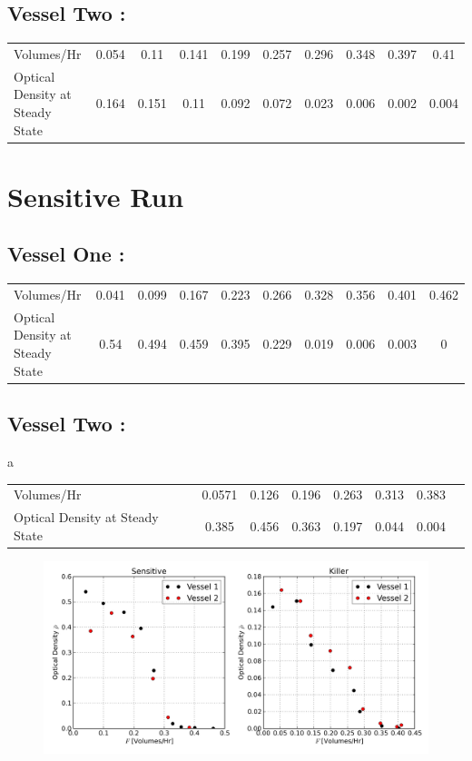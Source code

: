 \subsection*{Vessel Two :}
\begin{center}
\begin{tabular}{l|ccccccccc}
  Volumes/Hr & 0.054 & 0.11 & 0.141 & 0.199 & 0.257 & 0.296 & 0.348 & 0.397 & 0.41 \\
  Optical Density at Steady State & 0.164 & 0.151 & 0.11 & 0.092 & 0.072 & 0.023 & 0.006 & 0.002 & 0.004 \\
\end{tabular}
\end{center}

\section{Sensitive Run}
\subsection*{Vessel One :}
\begin{center}
\begin{tabular}{l|ccccccccc}
  Volumes/Hr & 0.041 & 0.099 & 0.167 & 0.223 & 0.266 & 0.328 & 0.356 & 0.401 & 0.462 \\
 Optical Density at Steady State & 0.54 & 0.494 & 0.459 & 0.395 & 0.229 & 0.019 & 0.006 & 0.003 & 0  \\
\end{tabular}
\end{center}

\subsection*{Vessel Two :}
\begin{center}
a\begin{tabular}{l|ccccccc}
 Volumes/Hr & 0.0571 & 0.126 & 0.196 & 0.263 & 0.313 & 0.383  \\
  Optical Density at Steady State & 0.385 & 0.456 & 0.363 & 0.197 & 0.044 & 0.004 \\
\end{tabular}
\end{center}


\begin{figure}[H]
  \centering
    \includegraphics[width=1.0\textwidth]{images/data.png}
\end{figure}





